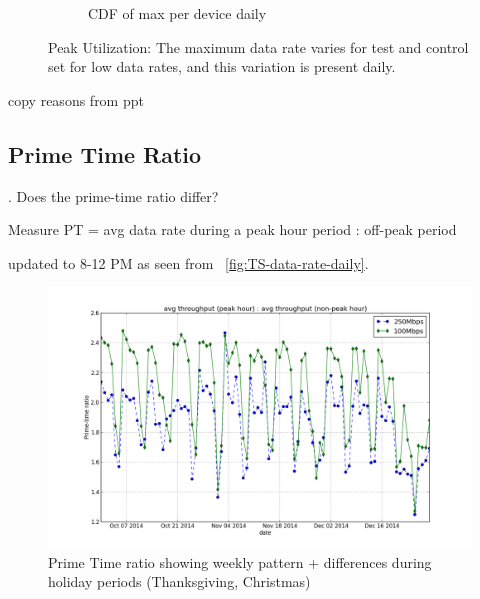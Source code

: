 \begin{figure}[t!]
\begin{minipage}{1\linewidth}
\begin{subfigure}[b]{\linewidth}
  \caption{CDF of max per device daily}
  \vspace{1em}
  \label{fig:CDF-data-rate-max-daily}
\end{subfigure}
\end{minipage}
\caption{Peak Utilization: The maximum data rate varies for test and control set for low data rates, and this variation is present daily.}
\label{fig:peak-utilization}
\end{figure}

copy reasons from ppt



\subsection{Prime Time Ratio}
\label{subsec:prime-time}

. Does the prime-time ratio differ?

Measure PT = avg data rate during a peak hour period : off-peak period

updated to 8-12 PM as seen from ~\ref{fig:TS-data-rate-daily}.




\begin{figure}[t!]
\begin{minipage}{1\linewidth}
\centering
\includegraphics[width=\linewidth]{figures/prime-time-ratio-by-date[replace].png}
\caption{Prime Time ratio showing weekly pattern + differences during holiday periods (Thanksgiving, Christmas)}
\label{fig:TS-prime-time-ratio}
\end{minipage}
\end{figure}

